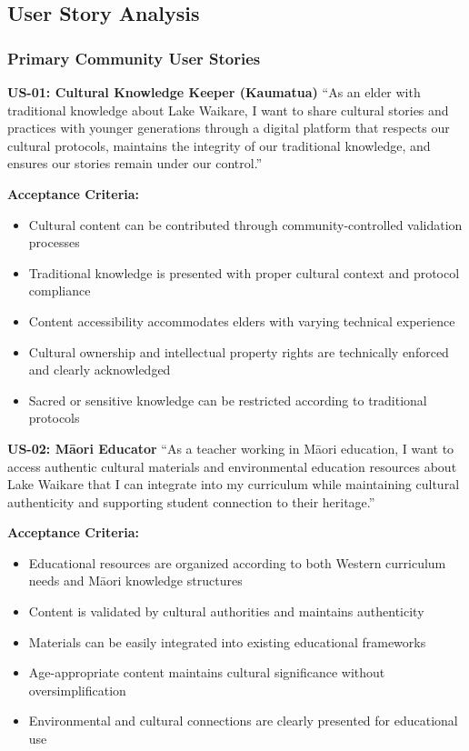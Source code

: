 \subsection{User Story Analysis}
\label{subsec:user_stories}

\subsubsection{Primary Community User Stories}
\label{subsubsec:primary_stories}

\textbf{US-01: Cultural Knowledge Keeper (Kaumatua)}
``As an elder with traditional knowledge about Lake Waikare, I want to share cultural stories and practices with younger generations through a digital platform that respects our cultural protocols, maintains the integrity of our traditional knowledge, and ensures our stories remain under our control.''

\textbf{Acceptance Criteria:}
\begin{itemize}
    \item Cultural content can be contributed through community-controlled validation processes
    \item Traditional knowledge is presented with proper cultural context and protocol compliance
    \item Content accessibility accommodates elders with varying technical experience
    \item Cultural ownership and intellectual property rights are technically enforced and clearly acknowledged
    \item Sacred or sensitive knowledge can be restricted according to traditional protocols
\end{itemize}

\textbf{US-02: M\=aori Educator}
``As a teacher working in M\=aori education, I want to access authentic cultural materials and environmental education resources about Lake Waikare that I can integrate into my curriculum while maintaining cultural authenticity and supporting student connection to their heritage.''

\textbf{Acceptance Criteria:}
\begin{itemize}
    \item Educational resources are organized according to both Western curriculum needs and M\=aori knowledge structures
    \item Content is validated by cultural authorities and maintains authenticity
    \item Materials can be easily integrated into existing educational frameworks
    \item Age-appropriate content maintains cultural significance without oversimplification
    \item Environmental and cultural connections are clearly presented for educational use
\end{itemize}

